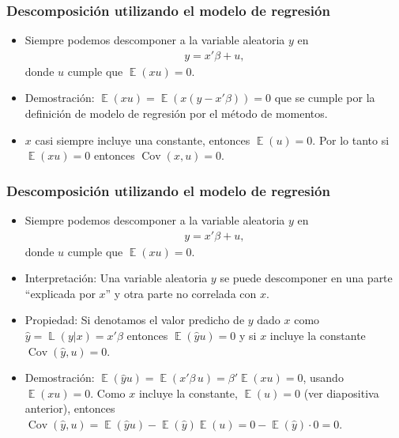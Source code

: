 \documentclass[t, compress, spanish, aspectratio=169]{beamer}
\DeclareMathOperator{\Cov}{Cov}
\DeclareMathOperator{\E}{\mathbb{E}}
\DeclareMathOperator{\LP}{\mathbb{L}}
\begin{document}
    \begin{frame}
        \frametitle{Descomposici\'on utilizando el modelo de regresi\'on}
        \begin{itemize}
            \item <1-> Siempre podemos descomponer a la variable aleatoria $y$ en
            \begin{align*}
            y = x'\beta + u,
            \end{align*}
            donde $u$ cumple que $\E(xu)=0$.
            
            \item <1-> Demostraci\'on: $\E(xu)=\E(x(y-x'\beta))=0$ que se cumple por la definici\'on de modelo de regresi\'on por el m\'etodo de momentos.
            \bigskip
            
           \item <1-> {$x$ casi siempre incluye una constante, entonces $\E(u)=0$. Por lo tanto si $\E(xu)=0$ entonces $\Cov(x,u)=0$.}
        \end{itemize}
    \end{frame}
    
    \begin{frame}
        \frametitle{Descomposici\'on utilizando el modelo de regresi\'on}
        \begin{itemize}
            \item <1-> Siempre podemos descomponer a la variable aleatoria $y$ en
            \begin{align*}
            y = x'\beta + u,
            \end{align*}
            donde $u$ cumple que $\E(xu)=0$.
            \item <1-> Interpretaci\'on: Una variable aleatoria $y$ se puede descomponer en una parte ``explicada por $x$'' y otra parte no correlada con $x$.
            \item <2-> Propiedad: Si denotamos el valor predicho de $y$ dado $x$ como $\hat y=\LP(y|x)=x'\beta$ entonces $\E(\hat y u)=0$ y si $x$ incluye la constante $\Cov(\hat y, u)=0$.
            \item <2-> [] Demostraci\'on: $\E(\hat y u)=\E(x'\beta \, u)=\beta'\E(xu)=0$, usando $\E(xu)=0$. Como $x$ incluye la constante, $\E(u)=0$ (ver diapositiva anterior), entonces $\Cov(\hat y,u)=\E(\hat y u)-\E(\hat y)\E(u)=0-\E(\hat y)\cdot 0=0$.
        \end{itemize}
    \end{frame}
    
\end{document}
